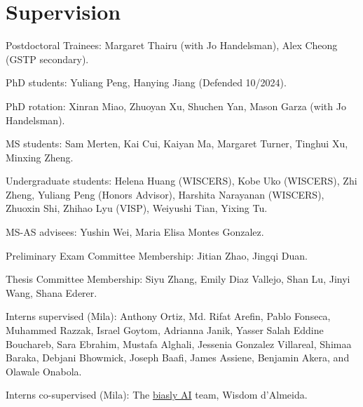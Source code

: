 \documentclass[letterpaper]{article}
\renewenvironment{itemize}{
  \begin{list}{}{
    \setlength{\leftmargin}{1.5em}
  }
}{
  \end{list}
}
\begin{document}
\section*{Supervision}
\begin{itemize}
\item Postdoctoral Trainees: Margaret Thairu (with Jo Handelsman), Alex Cheong (GSTP secondary).
\item PhD students: Yuliang Peng, Hanying Jiang (Defended 10/2024).
\item PhD rotation: Xinran Miao, Zhuoyan Xu, Shuchen Yan, Mason Garza (with Jo Handelsman).
\item MS students: Sam Merten, Kai Cui, Kaiyan Ma, Margaret Turner, Tinghui Xu, Minxing Zheng.
\item Undergraduate students: Helena Huang (WISCERS), Kobe Uko (WISCERS), Zhi
Zheng, Yuliang Peng (Honors Advisor), Harshita Narayanan (WISCERS), Zhuoxin Shi,
Zhihao Lyu (VISP), Weiyushi Tian, Yixing Tu.
\item MS-AS advisees: Yushin Wei, Maria Elisa Montes Gonzalez.
\item Preliminary Exam Committee Membership: Jitian Zhao, Jingqi Duan.
\item Thesis Committee Membership: Siyu Zhang, Emily Diaz Vallejo, Shan Lu,
Jinyi Wang, Shana Ederer.
\item Interns supervised (Mila): Anthony Ortiz, Md. Rifat Arefin, Pablo Fonseca,
  Muhammed Razzak, Israel Goytom, Adrianna Janik, Yasser Salah Eddine Bouchareb,
  Sara Ebrahim, Mustafa Alghali, Jessenia Gonzalez Villareal, Shimaa Baraka,
  Debjani Bhowmick, Joseph Baafi, James Assiene, Benjamin Akera, and Olawale
  Onabola.
\item Interns co-supervised (Mila): The
\href{https://sites.google.com/view/biaslyai/home}{biasly AI} team, Wisdom
d'Almeida.
\end{itemize}
\end{document}
